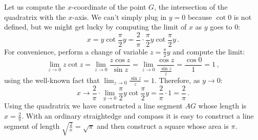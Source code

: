 \documentclass[11pt,a4paper]{article}
\newcommand*{\qd}{quadratrix}
\begin{document}
Let us compute the $x$-coordinate of the point $G$, the intersection of the \qd{} with the $x$-axis. We can't simply plug in $y=0$ because $\cot 0$ is not defined, but we might get lucky by computing the limit of $x$ as $y$ goes to $0$:
\[
x = y\cot \frac{\pi}{2}y = \frac{2}{\pi}\cdot \frac{\pi}{2}y\cot \frac{\pi}{2}y\,.
\]
For convenience, perform a change of variable $z=\frac{\pi}{2}y$ and compute the limit:
\[
\lim_{z\rightarrow 0} z\cot z = \lim_{z\rightarrow 0} \frac{z\cos z}{\sin z} = \lim_{z\rightarrow 0} \frac{\cos z}{\frac{\sin z}{z}} = \frac{\cos 0}{1} = 1\,,
\]
using the well-known fact that $\displaystyle\lim_{z\rightarrow 0} \frac{\sin z}{z}=1$.
Therefore, as $y\rightarrow 0$:
\[
x \rightarrow \frac{2}{\pi}\cdot \lim_{y\rightarrow 0}\frac{\pi}{2}y\cot \frac{\pi}{2}y = \frac{2}{\pi}\cdot 1 = \frac{2}{\pi}\,.
\]
Using the \qd{} we have constructed a line segment $AG$ whose length is $x=\displaystyle\frac{2}{\pi}$. With an ordinary straightedge and compass it is easy to construct a line segment of length $\sqrt{\frac{2}{x}}=\sqrt{\pi}$ and then construct a square whose area is $\pi$.
\end{document}
